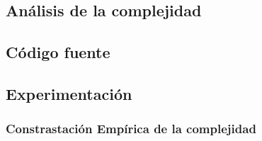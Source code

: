 \subsection{An\'alisis de la complejidad}

\subsection{C\'odigo fuente}

\subsection{Experimentaci\'on}

\subsubsection{Constrastaci\'on Emp\'irica de la complejidad}\label{tiempos}


